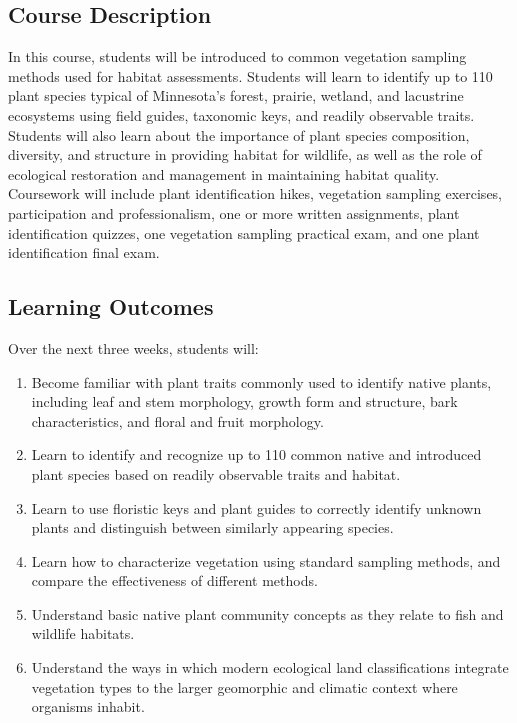 \documentclass{tufte-handout}
\begin{document}
\begin{fullwidth}

\section{Course Description}

In this course, students will be introduced to common vegetation sampling methods used for habitat assessments. Students will learn to identify up to 110 plant species typical of Minnesota’s forest, prairie, wetland, and lacustrine ecosystems using field guides, taxonomic keys, and readily observable traits. Students will also learn about the importance of plant species composition, diversity, and structure in providing habitat for wildlife, as well as the role of ecological restoration and management in maintaining habitat quality. Coursework will include plant identification hikes, vegetation sampling exercises, participation and professionalism, one or more written assignments, plant identification quizzes, one vegetation sampling practical exam, and one plant identification final exam.

\subsection{Learning Outcomes}

Over the next three weeks, students will:

\begin{enumerate}
	\item Become familiar with plant traits commonly used to identify native plants, including leaf and stem morphology, growth form and structure, bark characteristics, and floral and fruit morphology.
	\item Learn to identify and recognize up to 110 common native and introduced plant species based on readily observable traits and habitat.
	\item Learn to use floristic keys and plant guides to correctly identify unknown plants and distinguish between similarly appearing species.
	\item Learn how to characterize vegetation using standard sampling methods, and compare the effectiveness of different methods.
	\item Understand basic native plant community concepts as they relate to fish and wildlife habitats.
	\item Understand the ways in which modern ecological land classifications integrate vegetation types to the larger geomorphic and climatic context where organisms inhabit.
\end{enumerate}


\end{fullwidth}
\end{document}
